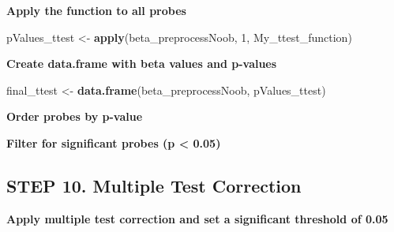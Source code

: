 \documentclass[
  11pt,
]{article}
\newenvironment{Shaded}{\begin{snugshade}}{\end{snugshade}}
\newcommand{\DecValTok}[1]{\textcolor[rgb]{0.00,0.00,0.81}{#1}}
\newcommand{\FloatTok}[1]{\textcolor[rgb]{0.00,0.00,0.81}{#1}}
\newcommand{\FunctionTok}[1]{\textcolor[rgb]{0.13,0.29,0.53}{\textbf{#1}}}
\newcommand{\NormalTok}[1]{#1}
\newcommand{\OtherTok}[1]{\textcolor[rgb]{0.56,0.35,0.01}{#1}}
\newcommand{\SpecialCharTok}[1]{\textcolor[rgb]{0.81,0.36,0.00}{\textbf{#1}}}
\begin{document}
\textbf{Apply the function to all probes}

\begin{Shaded}
\begin{Highlighting}[]
\NormalTok{pValues\_ttest }\OtherTok{\textless{}{-}} \FunctionTok{apply}\NormalTok{(beta\_preprocessNoob, }\DecValTok{1}\NormalTok{, My\_ttest\_function)}
\end{Highlighting}
\end{Shaded}

\textbf{Create data.frame with beta values and p-values}

\begin{Shaded}
\begin{Highlighting}[]
\NormalTok{final\_ttest }\OtherTok{\textless{}{-}} \FunctionTok{data.frame}\NormalTok{(beta\_preprocessNoob, pValues\_ttest)}
\end{Highlighting}
\end{Shaded}

\textbf{Order probes by p-value}

\begin{Shaded}
\end{Shaded}

\textbf{Filter for significant probes (p \textless{} 0.05)}

\begin{Shaded}
\end{Shaded}

\subsection{STEP 10. Multiple Test
Correction}\label{step-10.-multiple-test-correction}

\textbf{Apply multiple test correction and set a significant threshold
of 0.05}
\end{document}
